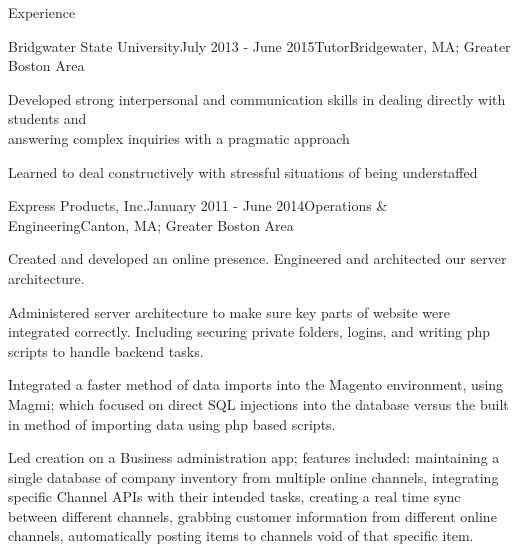 \documentclass{resume} %
\begin{document}
\begin{rSection}{Experience}
\begin{rSubsection}{Bridgwater State University}{July 2013 - June 2015}{Tutor}{Bridgewater, MA; Greater Boston Area}
 	      \item Developed strong interpersonal and communication skills in dealing directly with students and \\ answering complex inquiries with a pragmatic approach
          \item Learned to deal constructively with stressful situations of being understaffed
\end{rSubsection}

\begin{rSubsection}{Express Products, Inc.}{January 2011 - June 2014}{Operations \& Engineering}{Canton, MA; Greater Boston Area}
 	      \item Created and developed an online presence. Engineered and architected our server architecture. 
 	      \item Administered server architecture to make sure key parts of website were integrated correctly.
 	      Including securing private folders, logins, and writing php scripts to handle backend tasks.
          \item Integrated a faster method of data imports into the Magento environment, using Magmi; which 
          focused on direct SQL injections into the database versus the built in method of importing data using
           php based scripts.
          \item Led creation on a Business administration app; features included: maintaining a single database of company inventory from multiple online channels, integrating specific Channel APIs with their intended tasks, creating a real time sync between different channels, grabbing customer information from different online channels, automatically posting items to channels void of that specific item.
\end{rSubsection}



\end{rSection}


\end{document}
